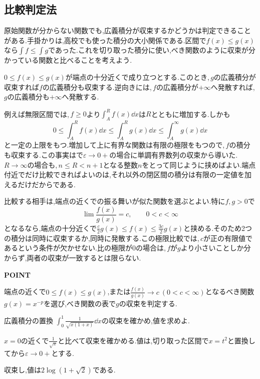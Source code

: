 \subsection{比較判定法}

原始関数が分からない関数でも,広義積分が収束するかどうかは判定できることがある.手掛かりは,高校でも使った積分の大小関係である.区間で$f(x)\le g(x)$なら$\int f\le\int g$であった.これを切り取った積分に使い,べき関数のように収束が分かっている関数と比べることを考えよう.

$0\le f(x)\le g(x)$が端点の十分近くで成り立つとする.このとき,\,$g$の広義積分が収束すれば$f$の広義積分も収束する.逆向きには,\,$f$の広義積分が$+\infty$へ発散すれば,\,$g$の広義積分も$+\infty$へ発散する.

例えば無限区間では,\,$f\ge0$より$\int_A^R f(x)\dd x$は$R$とともに増加する.しかも
\[
 0\le\int_A^Rf(x)\dd x\le\int_A^Rg(x)\dd x
 \le\int_A^{\infty}g(x)\dd x
\]
と一定の上限をもつ.増加して上に有界な関数は有限の極限をもつので,\,$f$の積分も収束する.この事実はで$\varepsilon\to0+$の場合に単調有界数列の収束から導いた.\,$R\to\infty$の場合も,\,$n\le R<n+1$となる整数$n$をとって同じように挟めばよい.端点付近でだけ比較できればよいのは,それ以外の閉区間の積分は有限の一定値を加えるだけだからである.

比較する相手は,端点の近くでの振る舞いが似た関数を選ぶとよい.特に$f,g>0$で
\[
 \lim\frac{f(x)}{g(x)}=c,\qquad0<c<\infty
\]
となるなら,端点の十分近くで$\frac c2g(x)\le f(x)\le\frac{3c}{2}g(x)$と挟める.そのため2つの積分は同時に収束するか,同時に発散する.この極限比較では,\,$c$が正の有限値であるという条件が欠かせない.比の極限が$0$の場合は,\,$f$が$g$より小さいことしか分からず,両者の収束が一致するとは限らない.

\begin{bookpoint}
\textbf{POINT}\par
端点の近くで$0\le f(x)\le g(x)$,または$\frac{f(x)}{g(x)}\to c\ (0<c<\infty)$となるべき関数$g(x)=x^{-p}$を選び,べき関数の表で$g$の収束を判定する.
\end{bookpoint}

\begin{example}{広義積分の置換}
$\int_0^1\frac1{\sqrt{x(1+x)}}\dd x$の収束を確かめ,値を求めよ.
\end{example}

$x=0$の近くで$\frac1{\sqrt{x}}$と比べて収束を確かめる.値は,切り取った区間で$x=t^2$と置換してから$\varepsilon\to0+$とする.

収束し,値は$2\log(1+\sqrt2)$である.

